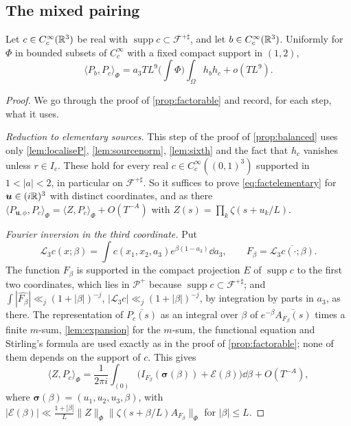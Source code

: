 \documentclass[11pt,colorlinks]{charlie}
\newcommand{\Om}{\Omega}
\newcommand{\ip}[2]{\langle #1,#2\rangle}
\begin{document}
\subsection{The mixed pairing}

\begin{proposition}\label{prop:factorableplus}
Let $c\in C_c^\infty(\mathbb{R}^3)$ be real with $\operatorname{supp}c\subset\mathcal F^{+\sharp}$, and let $b\in C_c^\infty(\mathbb{R}^3)$. Uniformly for $\Phi$ in bounded subsets of $C_c^\infty$ with a fixed compact support in $(1,2)$,
\[
 \ip{P_b}{P_c}_\Phi=a_3TL^9\Big(\int\Phi\Big)\int_\Om h_bh_c+o(TL^9).
\]
\end{proposition}
\begin{proof}
We go through the proof of \cref{prop:factorable} and record, for each step, what it uses.

\emph{Reduction to elementary sources.} This step of the proof of \cref{prop:balanced} uses only \cref{lem:localiseP}, \cref{lem:sourcenorm}, \cref{lem:sixth} and the fact that $h_c$ vanishes unless $r\in I_c$. These hold for every real $c\in C_c^\infty((0,1)^3)$ supported in $1<|a|<2$, in particular on $\mathcal F^{+\sharp}$. So it suffices to prove \eqref{eq:factelementary} for $\boldsymbol u\in(i\mathbb{R})^3$ with distinct coordinates, and as there $\ip{P_{\boldsymbol u,\phi}}{P_c}_\Phi=\ip Z{P_c}_\Phi+O(T^{-A})$ with $Z(s)=\prod_k\zeta(s+u_k/L)$.

\emph{Fourier inversion in the third coordinate.} Put
\[
 \mathcal L_3c(x;\beta)=\int c(x_1,x_2,a_3)e^{\beta(1-a_3)}\dd a_3,\qquad F_\beta=\overline{\mathcal L_3c(\cdot;\beta)} .
\]
The function $F_\beta$ is supported in the compact projection $E$ of $\operatorname{supp}c$ to the first two coordinates, which lies in $\mathcal P^+$ because $\operatorname{supp}c\subset\mathcal F^{+\sharp}$; and $\int|\widehat{F_\beta}|\ll_j(1+|\beta|)^{-j}$, $|\mathcal L_3c|\ll_j(1+|\beta|)^{-j}$, by integration by parts in $a_3$, as there. The representation of $\overline{P_c(s)}$ as an integral over $\beta$ of $e^{-\beta}\overline{A_{F_\beta}(s)}$ times a finite $m$-sum, \cref{lem:expansion} for the $m$-sum, the functional equation and Stirling's formula are used exactly as in the proof of \cref{prop:factorable}; none of them depends on the support of $c$. This gives
\[
 \ip Z{P_c}_\Phi=\frac1{2\pi i}\int_{(0)}\Big(I_{F_\beta}(\boldsymbol\sigma(\beta))+\mathcal E(\beta)\Big)\dd\beta+O(T^{-A}),
\]
where $\boldsymbol\sigma(\beta)=(u_1,u_2,u_3,\beta)$, with $|\mathcal E(\beta)|\ll\frac{1+|\beta|}L\|Z\|_\Phi\|\zeta(s+\beta/L)A_{F_\beta}\|_\Phi$ for $|\beta|\le L$.


\end{proof}
\end{document}
